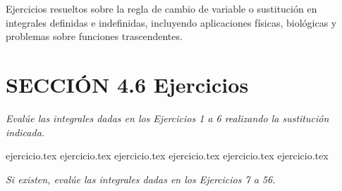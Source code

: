 
Ejercicios resueltos sobre la regla de cambio de variable o sustitución en integrales definidas e indefinidas, incluyendo aplicaciones físicas, biológicas y problemas sobre funciones trascendentes.

\section*{SECCIÓN 4.6 \quad Ejercicios}

\noindent \textit{Evalúe las integrales dadas en los Ejercicios 1 a 6 realizando la sustitución indicada.}

\begin{enumerate}
    {ejercicio.tex}
    {ejercicio.tex}
    {ejercicio.tex}
    {ejercicio.tex}
    {ejercicio.tex}
    {ejercicio.tex}
\end{enumerate}

\vspace{1em}
\noindent \textit{Si existen, evalúe las integrales dadas en los Ejercicios 7 a 56.}

